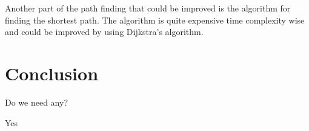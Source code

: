 \documentclass[12pt, a4paper]{article}
\begin{document}
Another part of the path finding that could be improved is the algorithm for finding the shortest path. The algorithm is quite expensive time complexity wise and could be improved by using Dijkstra's algorithm.


\section{Conclusion}

Do we need any?

Yes
\end{document}
